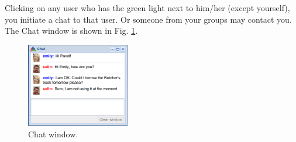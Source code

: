 \documentclass[article,A4,12pt]{llncs}
\begin{document}
\noindent
Clicking on any user who has the green light next to him/her (except yourself),
you initiate a chat to that user. Or someone from your groups may contact you. 
The Chat window is shown in Fig. \ref{fig:chat}.

\begin{figure}[!ht]
\begin{center}
\includegraphics[width=0.4\textwidth]{img/chat.png}
\end{center}
\caption{Chat window.}
\label{fig:chat}
\end{figure}
\end{document}
